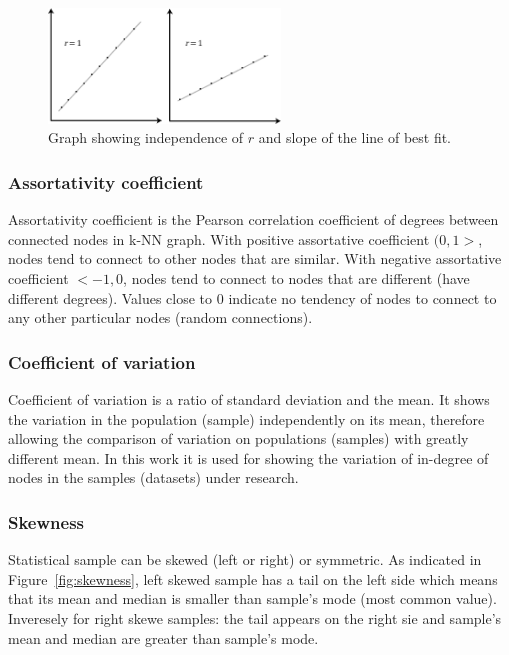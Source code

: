 \begin{figure}[h!]
  \centering
  \captionsetup{width=24pc, justification=centering}
    \includegraphics[width=0.55\textwidth]{images/pearson_graphs_slope.png}
  \caption{Graph showing independence of $r$ and slope of the line of best fit.}
  \label{fig:pearson_graph_slope}
\end{figure}

\subsubsection{Assortativity coefficient}
Assortativity coefficient is the Pearson correlation coefficient of degrees between connected nodes in k-NN graph.
With positive assortative coefficient $(0, 1>$, nodes tend to connect to other nodes that are similar.
With negative assortative coefficient $<-1, 0$, nodes tend to connect to nodes that are different (have different degrees).
Values close to $0$ indicate no tendency of nodes to connect to any other particular nodes (random connections).

\subsubsection{Coefficient of variation}
Coefficient of variation is a ratio of standard deviation and the mean.
It shows the variation in the population (sample) independently on its mean, therefore allowing the comparison of variation on populations (samples) with greatly different mean.
In this work it is used for showing the variation of in-degree of nodes in the samples (datasets) under research.

\subsubsection{Skewness}
Statistical sample can be skewed (left or right) or symmetric.
As indicated in Figure~\ref{fig:skewness}, left skewed sample has a tail on the left side which means that its mean and median is smaller than sample's mode (most common value).
Inveresely for right skewe samples: the tail appears on the right sie and sample's mean and median are greater than sample's mode.

